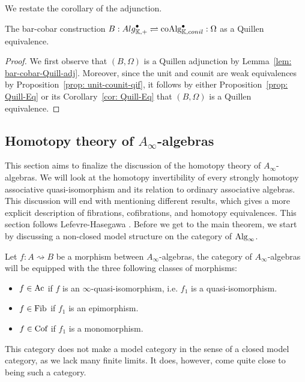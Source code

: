 \documentclass[../thesis.tex]{subfiles}
\begin{document}
        We restate the corollary of the adjunction.
        \begin{corollary}\label{cor: cobar-bar-quill-eq}
            The bar-cobar construction $B: {Alg}^\bullet_{\mathbb{K},+} \rightleftharpoons \tt{coAlg}^\bullet_{\mathbb{K},conil} : \Omega$ as a Quillen equivalence.
        \end{corollary}

        \begin{proof}
            We first observe that $(B, \Omega)$ is a Quillen adjunction by Lemma~\ref{lem: bar-cobar-Quill-adj}. Moreover, since the unit and counit are weak equivalences by Proposition~\ref{prop: unit-counit-qif}, it follows by either Proposition~\ref{prop: Quill-Eq} or its Corollary~\ref{cor: Quill-Eq} that $(B, \Omega)$ is a Quillen equivalence.
        \end{proof}

    \subsection{Homotopy theory of $A_{\infty}$-algebras}

        This section aims to finalize the discussion of the homotopy theory of $A_{\infty}$-algebras. We will look at the homotopy invertibility of every strongly homotopy associative quasi-isomorphism and its relation to ordinary associative algebras. This discussion will end with mentioning different results, which gives a more explicit description of fibrations, cofibrations, and homotopy equivalences. This section follows Lefevre-Hasegawa \cite{LefevreHasegawa03}. Before we get to the main theorem, we start by discussing a non-closed model structure on the category of $\tt{Alg}_\infty$.

        Let $f: A \rightsquigarrow B$ be a morphism between $A_\infty$-algebras, the category of $A_\infty$-algebras will be equipped with the three following classes of morphisms:
        \begin{itemize}
            \item $f\in \tt{Ac}$ if $f$ is an $\infty$-quasi-isomorphism, i.e. $f_1$ is a quasi-isomorphism.
            \item $f\in \tt{Fib}$ if $f_1$ is an epimorphism.
            \item $f\in \tt{Cof}$ if $f_1$ is a monomorphism.
        \end{itemize}

        This category does not make a model category in the sense of a closed model category, as we lack many finite limits. It does, however, come quite close to being such a category.
\end{document}
